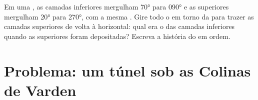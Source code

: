 \begin{exercise}[$\star\star\star$]\label{exo:b1:cross-sections:12}
Em uma , as camadas inferiores mergulham \ang{70} para \ang{090} e as superiores mergulham \ang{20} para \ang{270}, com a mesma . Gire todo o  em torno da  para trazer as camadas superiores de volta à horizontal: qual era o  das camadas inferiores quando as superiores foram depositadas? Escreva a história do  em ordem.
\end{exercise}

\section{Problema: um túnel sob as Colinas de Varden}

